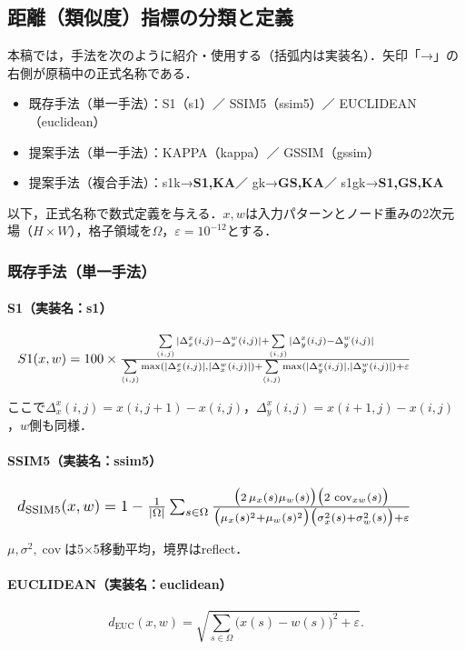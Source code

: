 \documentclass{jarticle}
\theoremstyle{definition}
\newcommand{\halfeq}[2][0.85\linewidth]{%
  \begin{equation}
    \makebox[\linewidth][l]{\resizebox{#1}{!}{\ensuremath{#2}}}%
  \end{equation}
}
\begin{document}
\subsection{距離（類似度）指標の分類と定義}
本稿では，手法を次のように紹介・使用する（括弧内は実装名）．矢印「→」の右側が原稿中の正式名称である．
\begin{itemize}
  \item 既存手法（単一手法）：S1（s1）／ SSIM5（ssim5）／ EUCLIDEAN（euclidean）
  \item 提案手法（単一手法）：KAPPA（kappa）／ GSSIM（gssim）
  \item 提案手法（複合手法）：s1k→\textbf{S1,KA}／ gk→\textbf{GS,KA}／ s1gk→\textbf{S1,GS,KA}
\end{itemize}

以下，正式名称で数式定義を与える．$x,w$は入力パターンとノード重みの2次元場（$H\times W$），格子領域を$\Omega$，$\varepsilon=10^{-12}$とする．

\subsubsection*{既存手法（単一手法）}
\paragraph{S1（実装名：s1）}
\halfeq[0.90\linewidth]{%
S1(x,w)=100\times
\frac{\sum\limits_{(i,j)}|\Delta_x^x(i,j)-\Delta_x^w(i,j)|+\sum\limits_{(i,j)}|\Delta_y^x(i,j)-\Delta_y^w(i,j)|}
{\sum\limits_{(i,j)}\max(|\Delta_x^x(i,j)|,|\Delta_x^w(i,j)|)+\sum\limits_{(i,j)}\max(|\Delta_y^x(i,j)|,|\Delta_y^w(i,j)|)+\varepsilon}%
}
ここで$\Delta_x^x(i,j)=x(i,j+1)-x(i,j)$，$\Delta_y^x(i,j)=x(i+1,j)-x(i,j)$，$w$側も同様．

\paragraph{SSIM5（実装名：ssim5）}
\halfeq[0.90\linewidth]{%
d_{\mathrm{SSIM5}}(x,w)=1-\frac{1}{|\Omega|}\sum_{s\in\Omega}
\frac{\bigl(2\,\mu_x(s)\mu_w(s)\bigr)\bigl(2\,\operatorname{cov}_{xw}(s)\bigr)}
{\bigl(\mu_x(s)^2+\mu_w(s)^2\bigr)\bigl(\sigma_x^2(s)+\sigma_w^2(s)\bigr)+\varepsilon}%
}
$\mu,\sigma^2,\operatorname{cov}$は5×5移動平均，境界はreflect．

\paragraph{EUCLIDEAN（実装名：euclidean）}
\begin{equation}
d_{\mathrm{EUC}}(x,w)=\sqrt{\sum_{s\in\Omega}\bigl(x(s)-w(s)\bigr)^2+\varepsilon}.
\end{equation}
\end{document}
